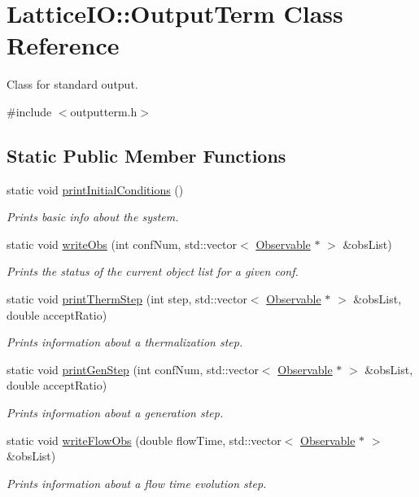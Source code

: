 \hypertarget{classLatticeIO_1_1OutputTerm}{}\section{Lattice\+IO\+:\+:Output\+Term Class Reference}
\label{classLatticeIO_1_1OutputTerm}


Class for standard output.  




{\ttfamily \#include $<$outputterm.\+h$>$}

\subsection*{Static Public Member Functions}
\begin{DoxyCompactItemize}
\item 
static void \hyperlink{classLatticeIO_1_1OutputTerm_ab92340daa2c801b5275d67838df1450b}{print\+Initial\+Conditions} ()
\begin{DoxyCompactList}\small\item\em Prints basic info about the system. \end{DoxyCompactList}\item 
static void \hyperlink{classLatticeIO_1_1OutputTerm_ab06002cace5e0450b9e618edfdb00d12}{write\+Obs} (int conf\+Num, std\+::vector$<$ \hyperlink{classObservable}{Observable} $\ast$ $>$ \&obs\+List)
\begin{DoxyCompactList}\small\item\em Prints the status of the current object list for a given conf. \end{DoxyCompactList}\item 
static void \hyperlink{classLatticeIO_1_1OutputTerm_aecda88f4a7724f1869fb40704d39ef58}{print\+Therm\+Step} (int step, std\+::vector$<$ \hyperlink{classObservable}{Observable} $\ast$ $>$ \&obs\+List, double accept\+Ratio)
\begin{DoxyCompactList}\small\item\em Prints information about a thermalization step. \end{DoxyCompactList}\item 
static void \hyperlink{classLatticeIO_1_1OutputTerm_a82d0d8fc4e4922df3c831c32a6802770}{print\+Gen\+Step} (int conf\+Num, std\+::vector$<$ \hyperlink{classObservable}{Observable} $\ast$ $>$ \&obs\+List, double accept\+Ratio)
\begin{DoxyCompactList}\small\item\em Prints information about a generation step. \end{DoxyCompactList}\item 
static void \hyperlink{classLatticeIO_1_1OutputTerm_a4ba09f68c5cc215b03ca3aec47d76d65}{write\+Flow\+Obs} (double flow\+Time, std\+::vector$<$ \hyperlink{classObservable}{Observable} $\ast$ $>$ \&obs\+List)
\begin{DoxyCompactList}\small\item\em Prints information about a flow time evolution step. \end{DoxyCompactList}\end{DoxyCompactItemize}


